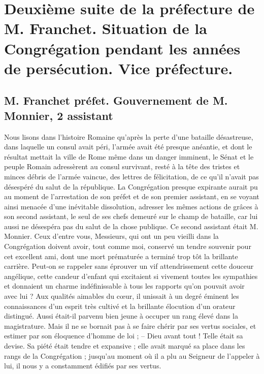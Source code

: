 \chapter{Deuxième suite de la préfecture de M. Franchet. Situation de la Congrégation pendant les années de persécution. Vice préfecture.}

\section*{M. Franchet préfet. Gouvernement de M. Monnier, 2 assistant}
Nous lisons dans l'histoire Romaine qu'après la perte d'une bataille désastreuse, dans laquelle un consul avait péri, l'armée avait été presque anéantie, et dont le résultat mettait la ville de Rome même dans un danger imminent, le Sénat et le peuple Romain adressèrent au consul survivant, resté à la tête des tristes et minces débris de l'armée vaincue, des lettres de félicitation, de ce qu'il n'avait pas désespéré du salut de la république. La Congrégation presque expirante aurait pu au moment de l'arrestation de son préfet et de son premier assistant, en se voyant ainsi menacée d'une inévitable dissolution, adresser les mêmes actions de grâces à son second assistant, le seul de ses chefs demeuré sur le champ de bataille, car lui aussi ne désespéra pas du salut de la chose publique. Ce second assistant était M. Monnier. Ceux d'entre vous, Messieurs, qui ont un peu vieilli dans la Congrégation doivent avoir, tout comme moi, conservé un tendre souvenir pour cet excellent ami, dont une mort prématurée a terminé trop tôt la brillante carrière. Peut-on se rappeler sans éprouver un vif attendrissement cette douceur angélique, cette candeur d'enfant qui excitaient si vivement toutes les
sympathies et donnaient un charme indéfinissable à tous les rapports qu'on pouvait avoir avec lui ? Aux qualités aimables du cœur, il unissait à un degré éminent les connaissances d'un esprit très cultivé et la brillante élocution d'un orateur distingué. Aussi était-il parvenu bien jeune à occuper un rang élevé dans la magistrature. Mais il ne se bornait pas à se faire chérir par ses vertus sociales, et estimer par son éloquence d'homme de loi ; -- Dieu avant tout ! Telle était sa devise. Sa piété était tendre et expansive ; elle avait marqué sa place dans les rangs de la Congrégation ; jusqu'au moment où il a plu au Seigneur de l'appeler à lui, il nous y a constamment édifiés par ses vertus.

